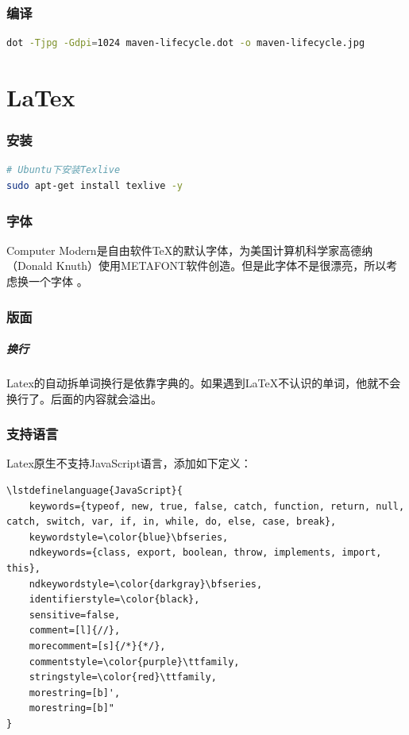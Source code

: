 \documentclass[letter]{book}
\begin{document}
\subsection{编译}



\begin{lstlisting}[language=Bash]
dot -Tjpg -Gdpi=1024 maven-lifecycle.dot -o maven-lifecycle.jpg
\end{lstlisting}


\chapter{LaTex}

\subsection{安装}

\begin{lstlisting}[language=Bash]
# Ubuntu下安装Texlive
sudo apt-get install texlive -y
\end{lstlisting}

\subsection{字体}

Computer Modern是自由软件TeX的默认字体，为美国计算机科学家高德纳（Donald Knuth）使用METAFONT软件创造。但是此字体不是很漂亮，所以考虑换一个字体 。

\subsection{版面}

\paragraph{换行}Latex的自动拆单词换行是依靠字典的。如果遇到\LaTeX{}不认识的单词，他就不会换行了。后面的内容就会溢出。

\subsection{支持语言}

Latex原生不支持JavaScript语言，添加如下定义：

\begin{lstlisting}[language=Tex]
%lstlisting包JavaScript语言设置
\lstdefinelanguage{JavaScript}{
	keywords={typeof, new, true, false, catch, function, return, null, catch, switch, var, if, in, while, do, else, case, break},
	keywordstyle=\color{blue}\bfseries,
	ndkeywords={class, export, boolean, throw, implements, import, this},
	ndkeywordstyle=\color{darkgray}\bfseries,
	identifierstyle=\color{black},
	sensitive=false,
	comment=[l]{//},
	morecomment=[s]{/*}{*/},
	commentstyle=\color{purple}\ttfamily,
	stringstyle=\color{red}\ttfamily,
	morestring=[b]',
	morestring=[b]"
}
\end{lstlisting}
\end{document}
